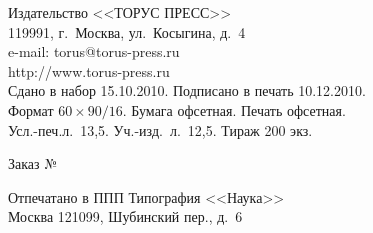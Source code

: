 \documentclass[11pt]{book}
\begin{document}
\begin{center}
\vspace*{10mm}






Издательство <<ТОРУС ПРЕСС>>\\


119991, г.\ Москва, ул.\ Косыгина, д.~4\\


e-mail: torus@torus-press.ru\\


http://www.torus-press.ru\\[3mm]














Сдано в набор 15.10.2010. Подписано в печать 10.12.2010.\\


Формат $60\times 90/16$. Бумага офсетная. Печать офсетная.\\


Усл.-печ.л.\ 13,5. Уч.-изд.\ л.\ 12,5. Тираж 200 экз.\\





\vspace*{3mm}


Заказ №\,\hspace*{25mm}\\


\vspace*{3mm}





Отпечатано в ППП Типография <<Наука>>\\


Москва 121099, Шубинский пер., д.~6\\





\end{center}
\end{document}
